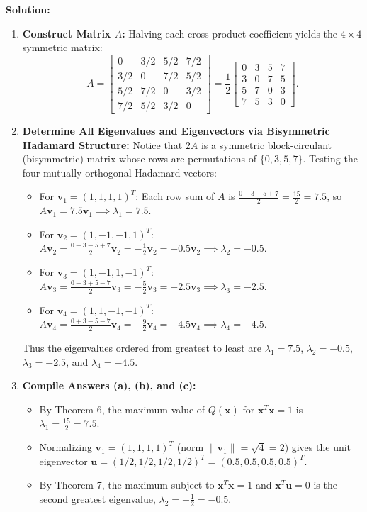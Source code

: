 \documentclass[11pt, letterpaper]{article}
\theoremstyle{definition}
\theoremstyle{remark}
\begin{document}
\textbf{Solution:}
\begin{enumerate}[label=\textbf{Step \arabic*:}]
    \item \textbf{Construct Matrix $A$:}
    Halving each cross-product coefficient yields the $4 \times 4$ symmetric matrix:
    \[
    A = \begin{bmatrix} 0 & 3/2 & 5/2 & 7/2 \\ 3/2 & 0 & 7/2 & 5/2 \\ 5/2 & 7/2 & 0 & 3/2 \\ 7/2 & 5/2 & 3/2 & 0 \end{bmatrix} = \frac{1}{2} \begin{bmatrix} 0 & 3 & 5 & 7 \\ 3 & 0 & 7 & 5 \\ 5 & 7 & 0 & 3 \\ 7 & 5 & 3 & 0 \end{bmatrix}.
    \]
    \item \textbf{Determine All Eigenvalues and Eigenvectors via Bisymmetric Hadamard Structure:}
    Notice that $2A$ is a symmetric block-circulant (bisymmetric) matrix whose rows are permutations of $\{0, 3, 5, 7\}$. Testing the four mutually orthogonal Hadamard vectors:
    \begin{itemize}
        \item For $\mathbf{v}_1 = (1, 1, 1, 1)^T$: Each row sum of $A$ is $\frac{0+3+5+7}{2} = \frac{15}{2} = 7.5$, so $A\mathbf{v}_1 = 7.5\mathbf{v}_1 \implies \lambda_1 = 7.5$.
        \item For $\mathbf{v}_2 = (1, -1, -1, 1)^T$: $A\mathbf{v}_2 = \frac{0 - 3 - 5 + 7}{2}\mathbf{v}_2 = -\frac{1}{2}\mathbf{v}_2 = -0.5\mathbf{v}_2 \implies \lambda_2 = -0.5$.
        \item For $\mathbf{v}_3 = (1, -1, 1, -1)^T$: $A\mathbf{v}_3 = \frac{0 - 3 + 5 - 7}{2}\mathbf{v}_3 = -\frac{5}{2}\mathbf{v}_3 = -2.5\mathbf{v}_3 \implies \lambda_3 = -2.5$.
        \item For $\mathbf{v}_4 = (1, 1, -1, -1)^T$: $A\mathbf{v}_4 = \frac{0 + 3 - 5 - 7}{2}\mathbf{v}_4 = -\frac{9}{2}\mathbf{v}_4 = -4.5\mathbf{v}_4 \implies \lambda_4 = -4.5$.
    \end{itemize}
    Thus the eigenvalues ordered from greatest to least are $\lambda_1 = 7.5$, $\lambda_2 = -0.5$, $\lambda_3 = -2.5$, and $\lambda_4 = -4.5$.
    \item \textbf{Compile Answers (a), (b), and (c):}
    \begin{itemize}
        \item[(a)] By Theorem 6, the maximum value of $Q(\mathbf{x})$ for $\mathbf{x}^T\mathbf{x} = 1$ is $\lambda_1 = \frac{15}{2} = 7.5$.
        \item[(b)] Normalizing $\mathbf{v}_1 = (1, 1, 1, 1)^T$ (norm $\|\mathbf{v}_1\| = \sqrt{4} = 2$) gives the unit eigenvector $\mathbf{u} = (1/2, 1/2, 1/2, 1/2)^T = (0.5, 0.5, 0.5, 0.5)^T$.
        \item[(c)] By Theorem 7, the maximum subject to $\mathbf{x}^T\mathbf{x} = 1$ and $\mathbf{x}^T\mathbf{u} = 0$ is the second greatest eigenvalue, $\lambda_2 = -\frac{1}{2} = -0.5$.
    \end{itemize}
\end{enumerate}
\end{document}
